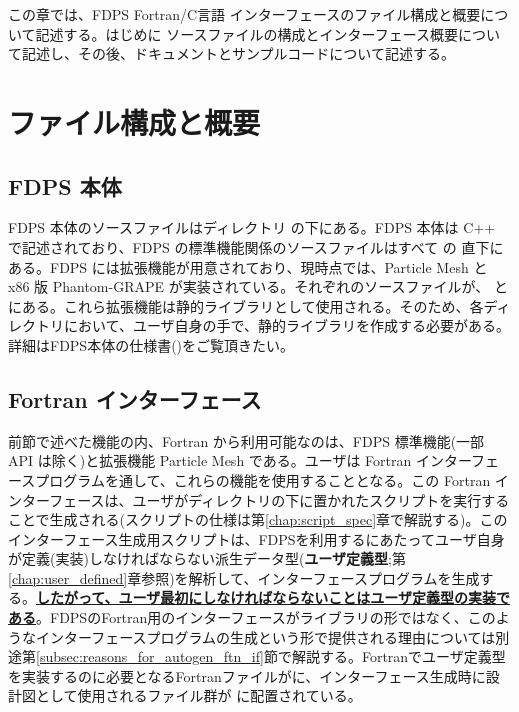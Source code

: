 この章では、FDPS Fortran/C言語 インターフェースのファイル構成と概要について記述する。はじめに
ソースファイルの構成とインターフェース概要について記述し、その後、ドキュメントとサンプルコードについて記述する。

\section{ファイル構成と概要}
\subsection{FDPS 本体}
FDPS 本体のソースファイルはディレクトリ  の下にある。FDPS 本体は C++ で記述されており、FDPS の標準機能関係のソースファイルはすべて  の 直下にある。FDPS には拡張機能が用意されており、現時点では、Particle Mesh と x86 版 Phantom-GRAPE が実装されている。それぞれのソースファイルが、 と  にある。これら拡張機能は静的ライブラリとして使用される。そのため、各ディレクトリにおいて、ユーザ自身の手で、静的ライブラリを作成する必要がある。詳細はFDPS本体の仕様書()をご覧頂きたい。
\subsection{Fortran インターフェース}
\label{subsec:file_str_ftn_if}
前節で述べた機能の内、Fortran から利用可能なのは、FDPS 標準機能(一部 API は除く)と拡張機能 Particle Mesh である。ユーザは Fortran インターフェースプログラムを通して、これらの機能を使用することとなる。この Fortran インターフェースは、ユーザがディレクトリの下に置かれたスクリプトを実行することで生成される(スクリプトの仕様は第\ref{chap:script_spec}章で解説する)。このインターフェース生成用スクリプトは、FDPSを利用するにあたってユーザ自身が定義(実装)しなければならない派生データ型(\textbf{ユーザ定義型};第\ref{chap:user_defined}章参照)を解析して、インターフェースプログラムを生成する。\uline{\textbf{したがって、ユーザ最初にしなければならないことはユーザ定義型の実装である}}。FDPSのFortran用のインターフェースがライブラリの形ではなく、このようなインターフェースプログラムの生成という形で提供される理由については別途第\ref{subsec:reasons_for_autogen_ftn_if}節で解説する。Fortranでユーザ定義型を実装するのに必要となるFortranファイルがに、インターフェース生成時に設計図として使用されるファイル群が  に配置されている。

